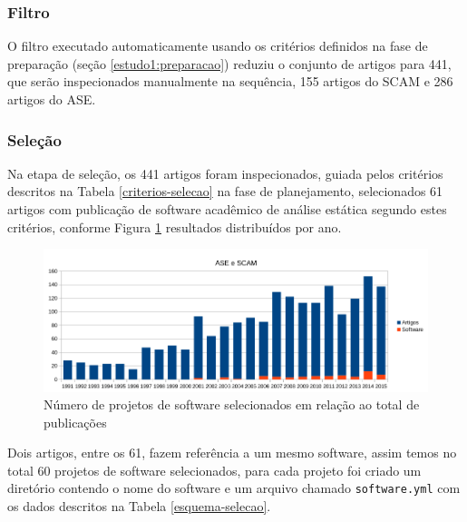 \subsubsection{Filtro}


O filtro executado automaticamente usando os critérios definidos na fase de
preparação (seção \ref{estudo1:preparacao}) reduziu o conjunto de artigos para
441, que serão inspecionados manualmente na sequência,
155 artigos do SCAM e 286 artigos do ASE.

\subsubsection{Seleção}

Na etapa de seleção, os 441 artigos foram inspecionados, guiada pelos critérios
descritos na Tabela \ref{criterios-selecao} na fase de planejamento,
selecionados 61 artigos com publicação de software acadêmico de análise estática
segundo estes critérios, conforme Figura \ref{artigos-e-software-por-ano}
resultados distribuídos por ano.

\begin{figure}[h]
  \center
  \includegraphics[scale=0.65]{imagens/artigos-e-software-por-ano.png}
  \caption{Número de projetos de software selecionados em relação ao total de publicações}
  \label{artigos-e-software-por-ano}
\end{figure}

Dois artigos, entre os 61, fazem referência a um mesmo software, assim temos no
total 60 projetos de software selecionados, para cada projeto foi criado um
diretório contendo o nome do software e um arquivo chamado
\texttt{software.yml} com os dados descritos na Tabela \ref{esquema-selecao}.



